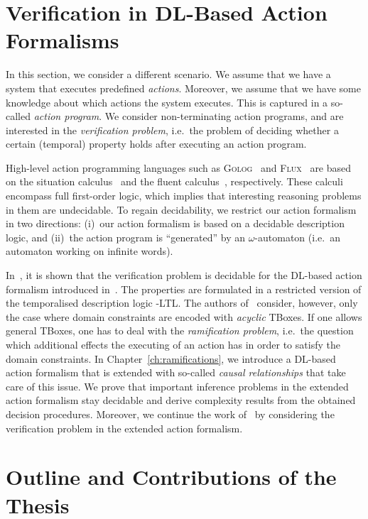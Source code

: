 \section{Verification in DL-Based Action Formalisms}\label{sec:intro-actions}

In this section, we consider a different scenario.  We assume that we have a
system that executes predefined \emph{actions}.  Moreover, we assume that we
have some knowledge about which actions the system executes.  This is captured
in a so-called \emph{action program}.  We consider non-terminating action
programs, and are interested in the \emph{verification problem}, i.e.~the
problem of deciding whether a certain (temporal) property holds after executing
an action program.

High-level action programming languages such as \textsc{Golog}~\cite{LRL+-JLP97}
and \textsc{Flux}~\cite{Thi-TPLP05} are based on the situation
calculus~\cite{Rei-01} and the fluent calculus~\cite{Thi-05}, respectively.
These calculi encompass full first-order logic, which implies that interesting
reasoning problems in them are undecidable.  To regain decidability, we restrict
our action formalism in two directions: (i)~our action formalism is based on a
decidable description logic, and (ii)~the action program is \enquote{generated}
by an $\omega$-automaton (i.e.~an automaton working on infinite words).

In~\cite{BaLM-ECAI10}, it is shown that the verification problem is decidable
for the DL-based action formalism introduced in~\cite{BLM+-AAAI05}.  The
properties are formulated in a restricted version of the temporalised
description logic \ALCO-LTL\@.  The authors of~\cite{BLM+-AAAI05,BaLM-ECAI10}
consider, however, only the case where domain constraints are encoded with
\emph{acyclic} TBoxes.  If one allows general TBoxes, one has to deal with the
\emph{ramification problem}, i.e.~the question which additional effects the
executing of an action has in order to satisfy the domain constraints.
%
In Chapter~\ref{ch:ramifications}, we introduce a DL-based action formalism that
is extended with so-called \emph{causal relationships} that take care of this
issue.  We prove that important inference problems in the extended action
formalism stay decidable and derive complexity results from the obtained
decision procedures.  Moreover, we continue the work of~\cite{BaLM-ECAI10} by
considering the verification problem in the extended action formalism.


\section{Outline and Contributions of the Thesis}\label{sec:outline}

